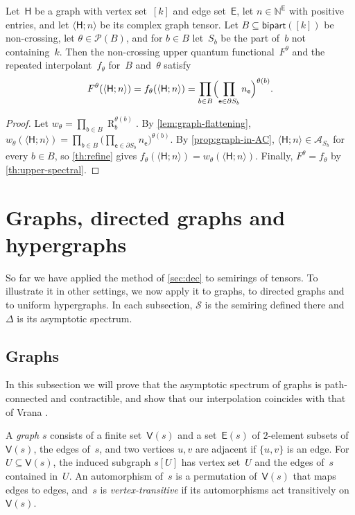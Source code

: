 \documentclass[11pt,letterpaper]{article}
\DeclareMathOperator{\tensorrank}{R}
\newcommand{\bipart}{\mathsf{bipart}}
\newcommand{\NN}{\mathbb{N}}
\begin{document}
\begin{corollary}\label{cor:upper-graph-values}
Let~$\mathsf{H}$ be a graph with vertex set~$[k]$ and edge set~$\mathsf{E}$, let $n \in \NN^{\mathsf{E}}$ with positive entries, and let $\langle \mathsf{H}; n \rangle$ be its complex graph tensor. Let $B \subseteq \bipart([k])$ be non-crossing, let $\theta \in \mathcal{P}(B)$, and for $b \in B$ let~$S_b$ be the part of~$b$ not containing~$k$. Then the non-crossing upper quantum functional~$F^\theta$ and the repeated interpolant~$f_\theta$ for~$B$ and~$\theta$ satisfy
\[
F^\theta(\langle \mathsf{H}; n \rangle) = f_\theta(\langle \mathsf{H}; n \rangle) = \prod_{b \in B} \Bigl( \prod_{\mathsf{e} \in \partial S_b} n_{\mathsf{e}} \Bigr)^{\theta(b)}.
\]
\end{corollary}
\begin{proof}
Let $w_\theta = \prod_{b \in B} \tensorrank_b^{\theta(b)}$. By \cref{lem:graph-flattening}, $w_\theta(\langle \mathsf{H}; n \rangle) = \prod_{b \in B} \bigl( \prod_{\mathsf{e} \in \partial S_b} n_{\mathsf{e}} \bigr)^{\theta(b)}$. By \cref{prop:graph-in-AC}, $\langle \mathsf{H}; n \rangle \in \mathcal{A}_{S_b}$ for every $b \in B$, so \cref{th:refine} gives $f_\theta(\langle \mathsf{H}; n \rangle) = w_\theta(\langle \mathsf{H}; n \rangle)$. Finally, $F^\theta = f_\theta$ by \cref{th:upper-spectral}.
\end{proof}

\section{Graphs, directed graphs and hypergraphs}

So far we have applied the method of \cref{sec:dec} to semirings of tensors. To illustrate it in other settings, we now apply it to graphs, to directed graphs and to uniform hypergraphs. In each subsection, $\mathcal{S}$ is the semiring defined there and~$\Delta$ is its asymptotic spectrum.

\subsection{Graphs}\label{sec:graphs}

In this subsection we will prove that the asymptotic spectrum of graphs is path-connected and contractible, and show that our interpolation coincides with that of Vrana \cite{MR4357434}.

A \emph{graph} $s$ consists of a finite set~$\mathsf{V}(s)$ and a set~$\mathsf{E}(s)$ of $2$-element subsets of~$\mathsf{V}(s)$, the edges of~$s$, and two vertices $u, v$ are adjacent if $\{u, v\}$ is an edge. For $U \subseteq \mathsf{V}(s)$, the induced subgraph $s[U]$ has vertex set~$U$ and the edges of~$s$ contained in~$U$. An automorphism of~$s$ is a permutation of~$\mathsf{V}(s)$ that maps edges to edges, and~$s$ is \emph{vertex-transitive} if its automorphisms act transitively on~$\mathsf{V}(s)$. 
\end{document}
